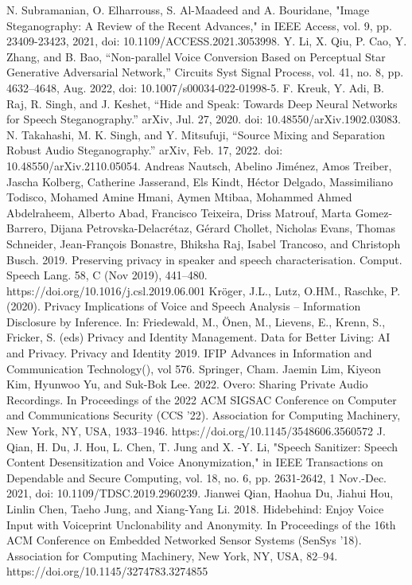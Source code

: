 \documentclass[conference]{IEEEtran}
\begin{document}
\begin{thebibliography}{00}
     N. Subramanian, O. Elharrouss, S. Al-Maadeed and A. Bouridane, "Image Steganography: A Review of the Recent Advances," in IEEE Access, vol. 9, pp. 23409-23423, 2021, doi: 10.1109/ACCESS.2021.3053998.
     Y. Li, X. Qiu, P. Cao, Y. Zhang, and B. Bao, “Non-parallel Voice Conversion Based on Perceptual Star Generative Adversarial Network,” Circuits Syst Signal Process, vol. 41, no. 8, pp. 4632–4648, Aug. 2022, doi: 10.1007/s00034-022-01998-5.
     F. Kreuk, Y. Adi, B. Raj, R. Singh, and J. Keshet, “Hide and Speak: Towards Deep Neural Networks for Speech Steganography.” arXiv, Jul. 27, 2020. doi: 10.48550/arXiv.1902.03083.
     N. Takahashi, M. K. Singh, and Y. Mitsufuji, “Source Mixing and Separation Robust Audio Steganography.” arXiv, Feb. 17, 2022. doi: 10.48550/arXiv.2110.05054.
     Andreas Nautsch, Abelino Jiménez, Amos Treiber, Jascha Kolberg, Catherine Jasserand, Els Kindt, Héctor Delgado, Massimiliano Todisco, Mohamed Amine Hmani, Aymen Mtibaa, Mohammed Ahmed Abdelraheem, Alberto Abad, Francisco Teixeira, Driss Matrouf, Marta Gomez-Barrero, Dijana Petrovska-Delacrétaz, Gérard Chollet, Nicholas Evans, Thomas Schneider, Jean-François Bonastre, Bhiksha Raj, Isabel Trancoso, and Christoph Busch. 2019. Preserving privacy in speaker and speech characterisation. Comput. Speech Lang. 58, C (Nov 2019), 441–480. https://doi.org/10.1016/j.csl.2019.06.001
     Kröger, J.L., Lutz, O.HM., Raschke, P. (2020). Privacy Implications of Voice and Speech Analysis – Information Disclosure by Inference. In: Friedewald, M., Önen, M., Lievens, E., Krenn, S., Fricker, S. (eds) Privacy and Identity Management. Data for Better Living: AI and Privacy. Privacy and Identity 2019. IFIP Advances in Information and Communication Technology(), vol 576. Springer, Cham.
     Jaemin Lim, Kiyeon Kim, Hyunwoo Yu, and Suk-Bok Lee. 2022. Overo: Sharing Private Audio Recordings. In Proceedings of the 2022 ACM SIGSAC Conference on Computer and Communications Security (CCS '22). Association for Computing Machinery, New York, NY, USA, 1933–1946. https://doi.org/10.1145/3548606.3560572
     J. Qian, H. Du, J. Hou, L. Chen, T. Jung and X. -Y. Li, "Speech Sanitizer: Speech Content Desensitization and Voice Anonymization," in IEEE Transactions on Dependable and Secure Computing, vol. 18, no. 6, pp. 2631-2642, 1 Nov.-Dec. 2021, doi: 10.1109/TDSC.2019.2960239.
     Jianwei Qian, Haohua Du, Jiahui Hou, Linlin Chen, Taeho Jung, and Xiang-Yang Li. 2018. Hidebehind: Enjoy Voice Input with Voiceprint Unclonability and Anonymity. In Proceedings of the 16th ACM Conference on Embedded Networked Sensor Systems (SenSys '18). Association for Computing Machinery, New York, NY, USA, 82–94. https://doi.org/10.1145/3274783.3274855

\end{thebibliography}
\end{document}
